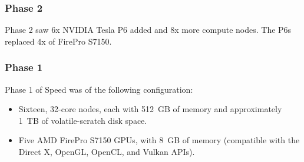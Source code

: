 \subsubsection{Phase 2}
Phase 2 saw 6x NVIDIA Tesla P6 added and 8x more compute nodes.
The P6s replaced 4x of FirePro S7150.

\subsubsection{Phase 1}
Phase 1 of Speed was of the following configuration:
\begin{itemize}
    \item
    Sixteen, 32-core nodes, each with 512~GB of memory and approximately 1~TB of volatile-scratch disk space.
    \item
    Five AMD FirePro S7150 GPUs, with 8~GB of memory (compatible with the Direct X, OpenGL, OpenCL, and Vulkan APIs).
\end{itemize}